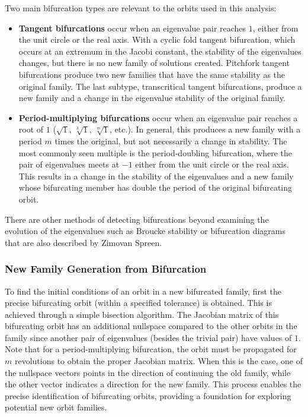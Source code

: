 Two main bifurcation types are relevant to the orbits used in this analysis:
\begin{itemize}
    \item \textbf{Tangent bifurcations} occur when an eigenvalue pair reaches $1$, either from the
    unit circle or the real axis. With a cyclic fold tangent bifurcation, which occurs at an
    extremum in the Jacobi constant, the stability of the eigenvalues changes, but there is no new
    family of solutions created. Pitchfork tangent bifurcations produce two new families that have
    the same stability as the original family. The last subtype, transcritical tangent
    bifurcations, produce a new family and a change in the eigenvalue stability of the original
    family.
    \item \textbf{Period-multiplying bifurcations} occur when an eigenvalue pair reaches a root of
    $1$ ($\sqrt{1}$, $\sqrt[3]{1}$, $\sqrt[m]{1}$, etc.). In general, this produces a new family
    with a period $m$ times the original, but not necessarily a change in stability. The most
    commonly seen multiple is the period-doubling bifurcation, where the pair of eigenvalues meets
    at $-1$ either from the unit circle or the real axis. This results in a change in the
    stability of the eigenvalues and a new family whose bifurcating member has double the period of
    the original bifurcating orbit.
\end{itemize}
There are other methods of detecting bifurcations beyond examining the evolution of the eigenvalues
such as Broucke stability or bifurcation diagrams that are also described by Zimovan
Spreen\cite{ZimovanSpreen:2021}.

\subsubsection{New Family Generation from Bifurcation}
To find the initial conditions of an orbit in a new bifurcated family, first the precise
bifurcating orbit (within a specified tolerance) is obtained. This is achieved through a simple
bisection algorithm. The Jacobian matrix of this bifurcating orbit has an additional nullspace
compared to the other orbits in the family since another pair of eigenvalues (besides the trivial
pair) have values of $1$. Note that for a period-multiplying bifurcation, the orbit must be
propagated for $m$ revolutions to obtain the proper Jacobian matrix. When this is the case, one of
the nullspace vectors points in the direction of continuing the old family, while the other vector
indicates a direction for the new family. This process enables the precise identification of
bifurcating orbits, providing a foundation for exploring potential new orbit families.


